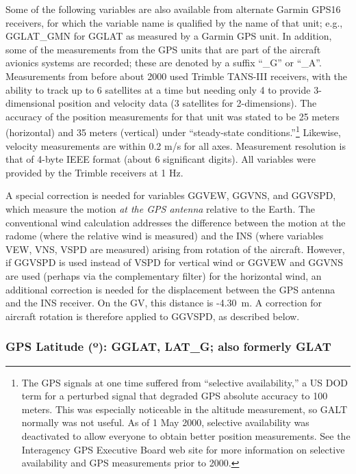 \documentclass[
  english,
]{book}
\begin{document}
Some of the following variables are also available from alternate Garmin
GPS16 receivers, for which the variable name is qualified by the name of
that unit; e.g., GGLAT\_GMN for GGLAT as measured by a Garmin GPS unit.
In addition, some of the measurements from the GPS units that are part
of the aircraft avionics systems are recorded; these are denoted by a
suffix ``\_G'' or ``\_A''. Measurements from before about 2000 used
Trimble TANS-III receivers, with the ability to track up to 6 satellites
at a time but needing only 4 to provide 3-dimensional position and
velocity data (3 satellites for 2-dimensions). The accuracy of the
position measurements for that unit was stated to be 25 meters
(horizontal) and 35 meters (vertical) under ``steady-state
conditions.''\footnote{The GPS signals at one time suffered from
  ``selective availability,'' a US DOD term for a perturbed signal that
  degraded GPS absolute accuracy to 100 meters. This was especially
  noticeable in the altitude measurement, so GALT normally was not
  useful. As of 1 May 2000, selective availability was deactivated to
  allow everyone to obtain better position measurements. See the
  Interagency GPS Executive Board web site for more information on
  selective availability and GPS measurements prior to 2000.} Likewise,
velocity measurements are within 0.2 m/s for all axes. Measurement
resolution is that of 4-byte IEEE format (about 6 significant digits).
All variables were provided by the Trimble receivers at 1 Hz.

A special correction is needed for variables GGVEW, GGVNS, and GGVSPD,
which measure the motion \emph{at the GPS antenna} relative to the
Earth. The conventional wind calculation addresses the difference
between the motion at the radome (where the relative wind is measured)
and the INS (where variables VEW, VNS, VSPD are measured) arising from
rotation of the aircraft. However, if GGVSPD is used instead of VSPD for
vertical wind or GGVEW and GGVNS are used (perhaps via the complementary
filter) for the horizontal wind, an additional correction is needed for
the displacement between the GPS antenna and the INS receiver. On the
GV, this distance is -4.30~m. A correction for aircraft rotation is
therefore applied to GGVSPD, as described below.

\hypertarget{gglat}{%
\subsubsection*{\texorpdfstring{GPS Latitude ({º}): GGLAT, LAT\_G; also
formerly
GLAT}{GPS Latitude (º): GGLAT, LAT\_G; also formerly GLAT}}\label{gglat}}
\end{document}
